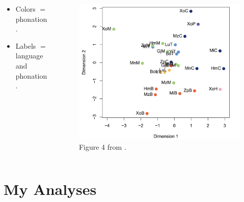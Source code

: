 \documentclass[professionalfonts]{beamer}
\begin{document}
\begin{frame}{\citet{keatingCrosslanguageAcousticSpace2023}}
  \begin{columns}
    \begin{column}{0.3\linewidth}
      \begin{itemize}
        \item Colors $=$ phonation.
        \item Labels $=$ language and phonation.
      \end{itemize}
    \end{column}
    \begin{column}{0.7\linewidth}
      \begin{figure}
        \includegraphics[width=.8\linewidth]{images/Keating_dimension.png}
        \caption{Figure 4 from \citet{keatingCrosslanguageAcousticSpace2023}.}
      \end{figure}
    \end{column}
  \end{columns}
\end{frame}

\section{My Analyses}
\end{document}

